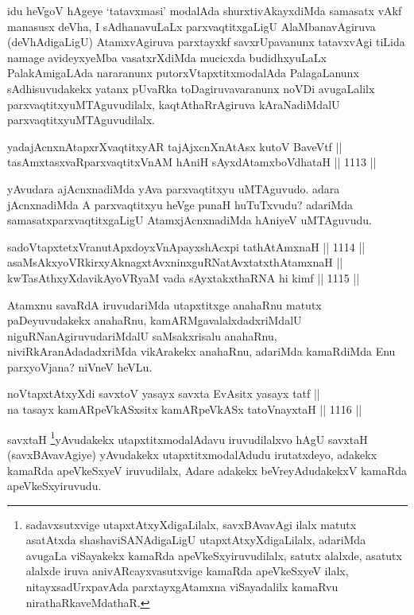 \begin{artha}
idu heVgoV hAgeye `tatavxmasi' modalAda shurxtivAkayxdiMda samasatx vAkf manasusx deVha, I sAdhanavuLaLx parxvaqtitxgaLigU  AlaMbanavAgiruva (deVhAdigaLigU) AtamxvAgiruva parxtayxkf savxrUpavanunx tatavxvAgi tiLida namage avideyxyeMba vasatxrXdiMda mucicxda budidhxyuLaLx PalakAmigaLAda nararanunx putorxVtapxtitxmodalAda PalagaLanunx sAdhisuvudakekx yatanx pUvaRka toDagiruvavaranunx noVDi avugaLalilx parxvaqtitxyuMTAguvudilalx, kaqtAthaRrAgiruva kAraNadiMdalU parxvaqtitxyuMTAguvudilalx.
\end{artha}

\begin{shl}
yadajAcnxnAtapxrXvaqtitxyAR tajAjxcnXnAtAsx kutoV BaveVtf || \\
tasAmxtasxvaRparxvaqtitxVnAM hAniH sAyxdAtamxboVdhataH ||  1113 ||  
\end{shl}

\begin{artha}
yAvudara ajAcnxnadiMda yAva parxvaqtitxyu uMTAguvudo. adara jAcnxnadiMda A parxvaqtitxyu heVge punaH huTuTxvudu? adariMda samasatxparxvaqtitxgaLigU AtamxjAcnxnadiMda hAniyeV uMTAguvudu.
\end{artha}

\begin{shl}
sadoVtapxtetxVranutApxdoyxV\s nApayxshAcxpi tathA\s \s tAmxnaH ||  1114 ||  \\
asaMsAkxyoVR\s kirxyAknagxtAvxninxguRNatAvxtatxthA\s \s tamxnaH || \\
kwTasAthxyXdavikAyoVR\s yaM vada sAyxtakxthaRNA hi kimf ||  1115 ||  
\end{shl}

\begin{artha}
Atamxnu savaRdA iruvudariMda utapxtitxge anahaRnu matutx paDeyuvudakekx anahaRnu, kamARMgavalalxdadxriMdalU niguRNanAgiruvudariMdalU saMsakxrisalu anahaRnu, niviRkAranAdadadxriMda vikArakekx anahaRnu, adariMda kamaRdiMda Enu parxyoVjana? niVneV heVLu.
\end{artha}

\begin{shl}
noVtapxtAtxyXdi savxtoV yasayx savxta EvAsitx yasayx tatf || \\
na tasayx kamARpeVkASx\s sitx kamARpeVkASx tatoV\s nayxtaH ||  1116 ||  
\end{shl}

\begin{artha}
savxtaH \footnote{sadavxsutxvige utapxtAtxyXdigaLilalx, savxBAvavAgi ilalx matutx asatAtxda shashaviSANAdigaLigU utapxtAtxyXdigaLilalx, adariMda avugaLa viSayakekx kamaRda apeVkeSxyiruvudilalx, satutx alalxde, asatutx alalxde iruva anivARcayxvasutxvige kamaRda apeVkeSxyeV ilalx, nitayxsadUrxpavAda parxtayxgAtamxna viSayadalilx kamaRvu nirathaRkaveMdathaR.}yAvudakekx utapxtitxmodalAdavu iruvudilalxvo hAgU savxtaH (savxBAvavAgiye) yAvudakekx utapxtitxmodalAdudu irutatxdeyo, adakekx kamaRda apeVkeSxyeV iruvudilalx, Adare adakekx beVreyAdudakekxV kamaRda apeVkeSxyiruvudu.
\end{artha}

